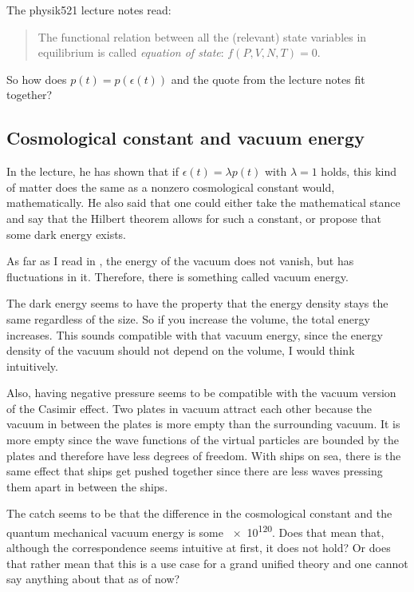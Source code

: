 The physik521 lecture notes read:
\begin{quote}
    The functional relation between all the (relevant) state variables in
    equilibrium is called \emph{equation of state}: $f(P, V, N, T) = 0$.
\end{quote}

So how does $p(t) = p(\epsilon(t))$ and the quote from the lecture notes fit
together?

\vfill
\vspace*{10cm}

\subsection*{Cosmological constant and vacuum energy}

In the lecture, he has shown that if $\epsilon(t) = \lambda p(t)$ with $\lambda
= 1$ holds, this kind of matter does the same as a nonzero cosmological
constant would, mathematically. He also said that one could either take the
mathematical stance and say that the Hilbert theorem allows for such a
constant, or propose that some dark energy exists.

As far as I read in \parencite{penrose-road_to_reality}, the energy of the
vacuum does not vanish, but has fluctuations in it. Therefore, there is
something called vacuum energy.

The dark energy seems to have the property that the energy density stays the
same regardless of the size. So if you increase the volume, the total energy
increases. This sounds compatible with that vacuum energy, since the energy
density of the vacuum should not depend on the volume, I would think
intuitively.

Also, having negative pressure seems to be compatible with the vacuum version
of the Casimir effect. Two plates in vacuum attract each other because the
vacuum in between the plates is more empty than the surrounding vacuum. It is
more empty since the wave functions of the virtual particles are bounded by the
plates and therefore have less degrees of freedom. With ships on sea, there is
the same effect that ships get pushed together since there are less waves
pressing them apart in between the ships.

The catch seems to be that the difference in the cosmological constant and the
quantum mechanical vacuum energy is some \num{e120}. Does that mean that,
although the correspondence seems intuitive at first, it does not hold? Or does
that rather mean that this is a use case for a grand unified theory and one
cannot say anything about that as of now?

\vfill
\vspace*{10cm}

\IfFileExists{\bibliographyfile}{
    \printbibliography
}{}




